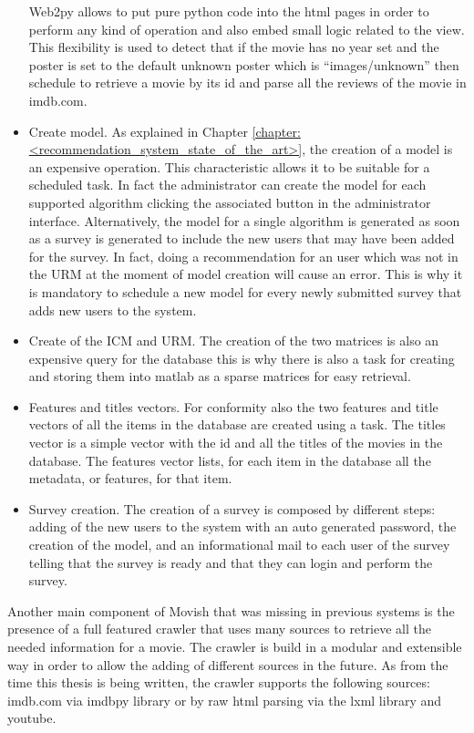 \begin{itemize}
Web2py allows to put pure python code into the html pages in order to perform any kind of operation and also embed small logic related to the view. This flexibility is used to detect that if the movie has no year set and the poster is set to the default unknown poster which is ``images/unknown'' then schedule to retrieve a movie by its id and parse all the reviews of the movie in imdb.com.
\item Create model. As explained in Chapter \ref{chapter:<recommendation_system_state_of_the_art>}, the creation of a model is an expensive operation. This characteristic allows it to be suitable for a scheduled task. In fact the administrator can create the model for each supported algorithm clicking the associated button in the administrator interface. Alternatively, the model for a single algorithm is generated as soon as a survey is generated to include the new users that may have been added for the survey.
In fact, doing a recommendation for an user which was not in the \ac{URM} at the moment of model creation will cause an error. This is why it is mandatory to schedule a new model for every newly submitted survey that adds new users to the system.
\item Create of the \ac{ICM} and \ac{URM}. The creation of the two matrices is also an expensive query for the database this is why there is also a task for creating and storing them into matlab as a sparse matrices for easy retrieval.
\item Features and titles vectors. For conformity also the two features and title vectors of all the items in the database are created using a task. The titles vector is a simple vector with the id and all the titles of the movies in the database. The features vector lists, for each item in the database all the metadata, or features, for that item.
\item Survey creation. The creation of a survey is composed by different steps: adding of the new users to the system with an auto generated password, the creation of the model, and an informational mail to each user of the survey telling that the survey is ready and that they can login and perform the survey.
\end{itemize}

Another main component of Movish that was missing in previous systems is the presence of a full featured crawler that uses many sources to retrieve all the needed information for a movie. The crawler is build in a modular and extensible way in order to allow the adding of different sources in the future. As from the time this thesis is being written, the crawler supports the following sources: imdb.com \cite{imdb} via imdbpy \cite{imdbpy} library or by raw html parsing via the lxml library and youtube. 


